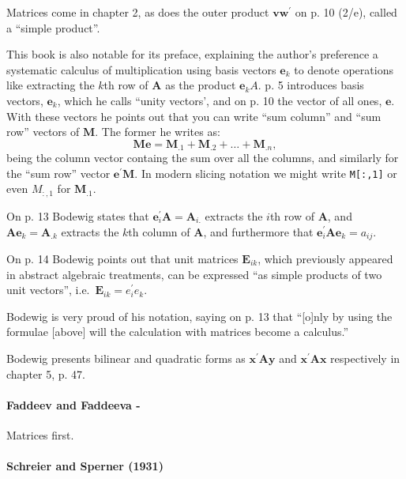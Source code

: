 Matrices come in chapter 2, as does the outer product $\mathbf v \mathbf w^\prime$
on p. 10 (2/e), called a ``simple product''.

This book is also notable for its preface, explaining the author's preference a
systematic calculus of multiplication using basis vectors $\mathbf e_k$ to denote
operations like extracting the $k$th row of $\mathbf A$ as the product $\mathbf e_k A$.
p. 5 introduces basis vectors, $\mathbf e_k$, which he calls ``unity vectors',
and on p. 10 the vector of all ones, $\mathbf e$. With these vectors he points
out that you can write ``sum column'' and ``sum row'' vectors of $\mathbf M$. The
former he writes as:
\[
\mathbf{Me} = \mathbf M_{.1} + \mathbf M_{.2} + \dots + \mathbf M_{.n},
\]
being the column vector containg the sum over all the columns, and similarly for
the ``sum row'' vector $\mathbf{e^\prime M}$. In modern slicing notation we might
write \verb|M[:,1]| or even $M_{:,1}$ for $\mathbf M_{.1}$.

On p. 13 Bodewig states that $\mathbf e^\prime_i \mathbf A = \mathbf A_{i.}$
extracts the $i$th row of $\mathbf A$, and $\mathbf A \mathbf e_k = \mathbf A_{.k}$
extracts the $k$th column of $\mathbf A$, and furthermore that
$\mathbf e^\prime_i \mathbf A \mathbf e_k = a_{ij}$.

On p. 14 Bodewig points out that unit matrices $\mathbf E_{ik}$, which previously
appeared in abstract algebraic treatments, can be expressed ``as simple products
of two unit vectors'', i.e.\ $\mathbf E_{ik} = e^\prime_i e_k$.

Bodewig is very proud of his notation, saying on p. 13 that
``[o]nly by using the formulae [above] will the calculation with matrices become a calculus.''

Bodewig presents bilinear and quadratic forms as $\mathbf{x^\prime A y}$ and
$\mathbf{x^\prime A x}$ respectively in chapter 5, p. 47.



\paragraph{Faddeev and Faddeeva - \cite{Faddeev1959}}

Matrices first.



\paragraph{Schreier and Sperner (1931)~\cite{Schreier1931}}

